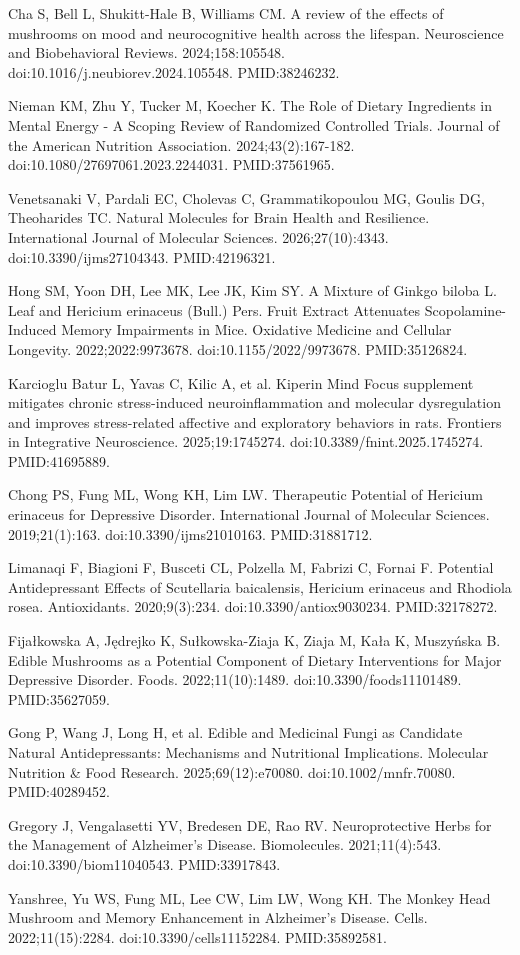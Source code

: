 \documentclass[11pt,oneside]{book}
\newcommand{\reff}[2]{\par\hangindent=7mm\hangafter=1\noindent[#1]\hspace{2mm}#2\par}
\begin{document}
\reff{51}{Cha S, Bell L, Shukitt-Hale B, Williams CM. A review of the effects of mushrooms on mood and neurocognitive health across the lifespan. Neuroscience and Biobehavioral Reviews. 2024;158:105548. doi:10.1016/j.neubiorev.2024.105548. PMID:38246232.}
\reff{52}{Nieman KM, Zhu Y, Tucker M, Koecher K. The Role of Dietary Ingredients in Mental Energy - A Scoping Review of Randomized Controlled Trials. Journal of the American Nutrition Association. 2024;43(2):167-182. doi:10.1080/27697061.2023.2244031. PMID:37561965.}
\reff{53}{Venetsanaki V, Pardali EC, Cholevas C, Grammatikopoulou MG, Goulis DG, Theoharides TC. Natural Molecules for Brain Health and Resilience. International Journal of Molecular Sciences. 2026;27(10):4343. doi:10.3390/ijms27104343. PMID:42196321.}
\reff{54}{Hong SM, Yoon DH, Lee MK, Lee JK, Kim SY. A Mixture of Ginkgo biloba L. Leaf and Hericium erinaceus (Bull.) Pers. Fruit Extract Attenuates Scopolamine-Induced Memory Impairments in Mice. Oxidative Medicine and Cellular Longevity. 2022;2022:9973678. doi:10.1155/2022/9973678. PMID:35126824.}
\reff{55}{Karcioglu Batur L, Yavas C, Kilic A, et al. Kiperin Mind Focus supplement mitigates chronic stress-induced neuroinflammation and molecular dysregulation and improves stress-related affective and exploratory behaviors in rats. Frontiers in Integrative Neuroscience. 2025;19:1745274. doi:10.3389/fnint.2025.1745274. PMID:41695889.}
\reff{56}{Chong PS, Fung ML, Wong KH, Lim LW. Therapeutic Potential of Hericium erinaceus for Depressive Disorder. International Journal of Molecular Sciences. 2019;21(1):163. doi:10.3390/ijms21010163. PMID:31881712.}
\reff{57}{Limanaqi F, Biagioni F, Busceti CL, Polzella M, Fabrizi C, Fornai F. Potential Antidepressant Effects of Scutellaria baicalensis, Hericium erinaceus and Rhodiola rosea. Antioxidants. 2020;9(3):234. doi:10.3390/antiox9030234. PMID:32178272.}
\reff{58}{Fijałkowska A, Jędrejko K, Sułkowska-Ziaja K, Ziaja M, Kała K, Muszyńska B. Edible Mushrooms as a Potential Component of Dietary Interventions for Major Depressive Disorder. Foods. 2022;11(10):1489. doi:10.3390/foods11101489. PMID:35627059.}
\reff{59}{Gong P, Wang J, Long H, et al. Edible and Medicinal Fungi as Candidate Natural Antidepressants: Mechanisms and Nutritional Implications. Molecular Nutrition \& Food Research. 2025;69(12):e70080. doi:10.1002/mnfr.70080. PMID:40289452.}
\reff{60}{Gregory J, Vengalasetti YV, Bredesen DE, Rao RV. Neuroprotective Herbs for the Management of Alzheimer's Disease. Biomolecules. 2021;11(4):543. doi:10.3390/biom11040543. PMID:33917843.}
\reff{61}{Yanshree, Yu WS, Fung ML, Lee CW, Lim LW, Wong KH. The Monkey Head Mushroom and Memory Enhancement in Alzheimer's Disease. Cells. 2022;11(15):2284. doi:10.3390/cells11152284. PMID:35892581.}
\end{document}
